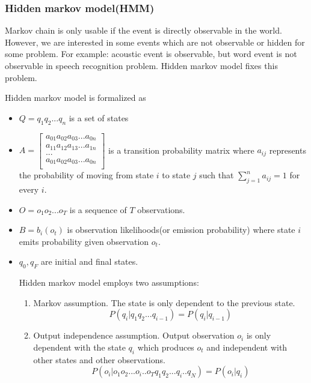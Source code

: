 \subsubsection{Hidden markov model(HMM)}
\label{HMM}
Markov chain is only usable if the event is directly observable in the world. However, we are interested in some events which are not observable or hidden for some problem. For example: acoustic event is observable, but word event is not observable in speech recognition problem. Hidden markov model fixes this problem. 

Hidden markov model is formalized as 
\begin{itemize}
\item $Q=q_{1}q_{2}...q_{n}$ is a set of states
\item  $A=
\begin{bmatrix}
a_{01}a_{02}a_{03}...a_{0n} \\
a_{11}a_{12}a_{13}...a_{1n} \\
... \\
a_{01}a_{02}a_{03}...a_{0n} \\
\end{bmatrix}$ is a transition probability matrix where $a_{ij}$ represents the probability of moving from state $i$ to state $j$ such that $\sum_{j=1}^{n}  a_{ij}=1$ for every $i$.
\item $O=o_{1}o_{2}...o_{T}$ is a sequence of $T$ observations.
\item $B=b_{i}(o_{t})$ is observation likelihoods(or emission probability) where state $i$ emits probability given observation $o_{t}$. 
\item $q_{0},q_{F}$ are initial and final states.

Hidden markov model employs two assumptions:
\begin{enumerate}
\item Markov assumption. The state is only dependent to the previous state.
\begin{equation}
P(q_{i}|q_{1}q_{2}...q_{i-1}) = P(q_{i}|q_{i-1})
\end{equation}
\item Output independence assumption. Output observation $o_{i}$ is only dependent with the state $q_{i}$ which produces $o_{t}$ and independent with other states and other observations.
\begin{equation}
P(o_{i}|o_{1}o_{2}...o_{i}..o_{T}q_{1}q_{2}...q_{i}..q_{N}) = P(o_{i}|q_{i})
\end{equation}

\end{enumerate}

\end{itemize}  

